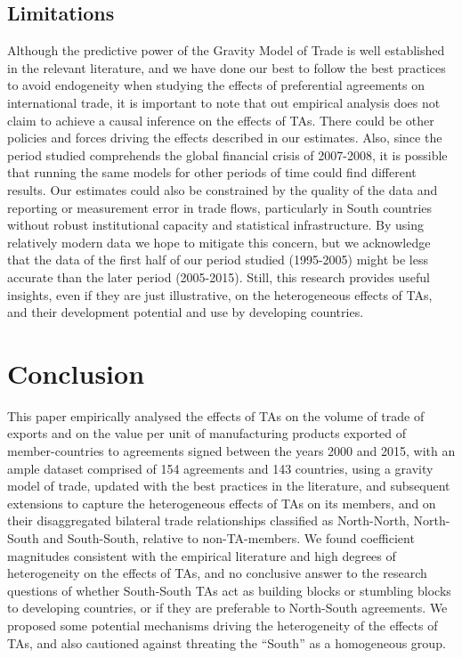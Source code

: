 \documentclass[12pt]{article}%
\begin{document}
\subsection{Limitations}%
\label{subsec:Limitations}%
Although the predictive power of the Gravity Model of Trade is well
established in the relevant literature, and we have done our best to
follow the best practices to avoid endogeneity when studying the effects
of preferential agreements on international trade, it is important to
note that out empirical analysis does not claim to achieve a causal
inference on the effects of TAs. There could be other policies and
forces driving the effects described in our estimates. Also, since the
period studied comprehends the global financial crisis of 2007-2008, it
is possible that running the same models for other periods of time could
find different results. Our estimates could also be constrained by the
quality of the data and reporting or measurement error in trade flows,
particularly in South countries without robust institutional capacity
and statistical infrastructure. By using relatively modern data we hope
to mitigate this concern, but we acknowledge that the data of the first
half of our period studied (1995-2005) might be less accurate than the
later period (2005-2015). Still, this research provides useful insights,
even if they are just illustrative, on the heterogeneous effects of TAs,
and their development potential and use by developing countries.

%
\section{Conclusion}%
\label{sec:Conclusion}%
This paper empirically analysed the effects of TAs on the volume of
trade of exports and on the value per unit of manufacturing products
exported of member-countries to agreements signed between the years 2000
and 2015, with an ample dataset comprised of 154 agreements and 143
countries, using a gravity model of trade, updated with the best
practices in the literature, and subsequent extensions to capture the
heterogeneous effects of TAs on its members, and on their disaggregated
bilateral trade relationships classified as North-North, North-South and
South-South, relative to non-TA-members. We found coefficient magnitudes
consistent with the empirical literature and high degrees of
heterogeneity on the effects of TAs, and no conclusive answer to the
research questions of whether South-South TAs act as building blocks or
stumbling blocks to developing countries, or if they are preferable to
North-South agreements. We proposed some potential mechanisms driving
the heterogeneity of the effects of TAs, and also cautioned against
threating the ``South'' as a homogeneous group.
\end{document}
